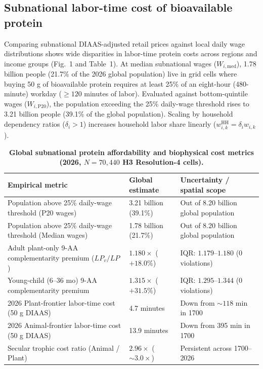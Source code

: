 \documentclass[11pt,a4paper]{article}
\begin{document}
\subsection*{Subnational labor-time cost of bioavailable protein}
Comparing subnational DIAAS-adjusted retail prices against local daily wage distributions shows wide disparities in labor-time protein costs across regions and income groups (Fig.~1 and Table~1). At median subnational wages ($W_{i,\mathrm{med}}$), 1.78 billion people (21.7\% of the 2026 global population) live in grid cells where buying 50 g of bioavailable protein requires at least 25\% of an eight-hour (480-minute) workday ($\ge 120$ minutes of labor). Evaluated against bottom-quintile wages ($W_{i,\mathrm{P20}}$), the population exceeding the 25\% daily-wage threshold rises to 3.21 billion people (39.1\% of the global population). Scaling by household dependency ratios ($\delta_i > 1$) increases household labor share linearly ($w_{i,k}^{\mathrm{HH}} = \delta_i w_{i,k}$).

\begin{table}[htbp]\centering
\caption{\textbf{Global subnational protein affordability and biophysical cost metrics (2026, $N = 70,440$ H3 Resolution-4 cells).}}
\begin{tabular}{lll}\toprule
\textbf{Empirical metric} & \textbf{Global estimate} & \textbf{Uncertainty / spatial scope} \\\midrule
Population above 25\% daily-wage threshold (P20 wages) & 3.21 billion (39.1\%) & Out of 8.20 billion global population \\
Population above 25\% daily-wage threshold (Median wages) & 1.78 billion (21.7\%) & Out of 8.20 billion global population \\
Adult plant-only 9-AA complementarity premium ($LP_v / LP$) & $1.180\times$ ($+18.0\%$) & IQR: $1.179\text{--}1.180$ (0 violations) \\
Young-child (6--36 mo) 9-AA complementarity premium & $1.315\times$ ($+31.5\%$) & IQR: $1.295\text{--}1.344$ (0 violations) \\
2026 Plant-frontier labor-time cost (50 g DIAAS) & 4.7 minutes & Down from $\sim 118$ min in 1700 \\
2026 Animal-frontier labor-time cost (50 g DIAAS) & 13.9 minutes & Down from 395 min in 1700 \\
Secular trophic cost ratio (Animal / Plant) & $2.96\times$ ($\sim 3.0\times$) & Persistent across 1700--2026 \\\bottomrule
\end{tabular}\end{table}
\end{document}

